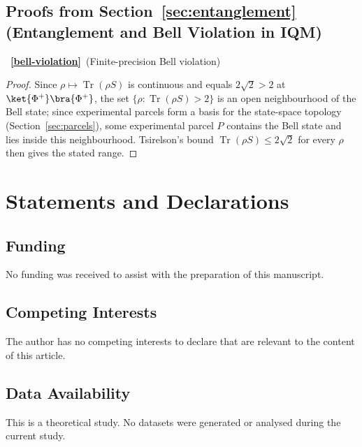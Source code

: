 \documentclass[11pt, onecolumn]{article}
\begin{document}
\subsection*{Proofs from Section~\ref{sec:entanglement} (Entanglement and Bell Violation in IQM)}

~{\bf \ref{bell-violation}}~(Finite-precision Bell violation)

\begin{proof}
Since $\rho\mapsto\operatorname{Tr}(\rho S)$ is continuous and equals $2\sqrt2>2$ at $\ket{\Phi^+}\bra{\Phi^+}$, the set $\{\rho:\operatorname{Tr}(\rho S)>2\}$ is an open neighbourhood of the Bell state; since experimental parcels form a basis for the state-space topology (Section~\ref{sec:parcels}), some experimental parcel $P$ contains the Bell state and lies inside this neighbourhood. Tsirelson's bound $\operatorname{Tr}(\rho S)\le2\sqrt2$ for every $\rho$ then gives the stated range.
\end{proof}

\section*{Statements and Declarations}

\subsection*{Funding}
No funding was received to assist with the preparation of this manuscript.

\subsection*{Competing Interests}
The author has no competing interests to declare that are relevant to the
content of this article.

\subsection*{Data Availability}
This is a theoretical study. No datasets were generated or analysed during
the current study.



\end{document}
